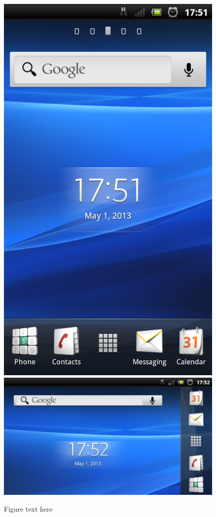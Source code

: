 \begin{figure}[t]
	\centering
    	\includegraphics[scale=0.20]{part_2/context_awareness/screenshot_2013-05-01_1751.png}
    	\includegraphics[scale=0.20]{part_2/context_awareness/screenshot_2013-05-01_1752.png}
		\caption{Figure text here} 
\end{figure}
	
